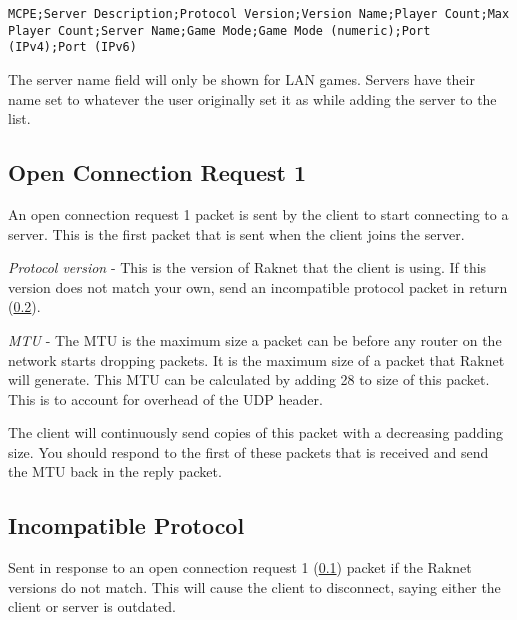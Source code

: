 \texttt{MCPE;Server Description;Protocol Version;Version Name;Player Count;Max Player Count;Server Name;Game Mode;Game Mode (numeric);Port (IPv4);Port (IPv6)}

The server name field will only be shown for LAN games.
Servers have their name set to whatever the user originally set it as while adding the server to the list.

\subsection{Open Connection Request 1}\label{subsec:open-connection-request1}

An open connection request 1 packet is sent by the client to start connecting to a server.
This is the first packet that is sent when the client joins the server.


\textit{Protocol version} - This is the version of Raknet that the client is using.
If this version does not match your own, send an incompatible protocol packet in return
(\ref{subsec:incompatible-protocol}). 

\textit{MTU} - The MTU is the maximum size a packet can be before any router on the network
starts dropping packets. It is the maximum size of a packet that Raknet will generate.
This MTU can be calculated by adding 28 to size of this packet. This is to account for overhead of the UDP header.

The client will continuously send copies of this packet with a decreasing padding size.
You should respond to the first of these packets that is received and send the MTU back in the reply packet.

\subsection{Incompatible Protocol}\label{subsec:incompatible-protocol}

Sent in response to an open connection request 1 (\ref{subsec:open-connection-request1}) packet if the Raknet versions do not match.
This will cause the client to disconnect, saying either the client or server is outdated.

